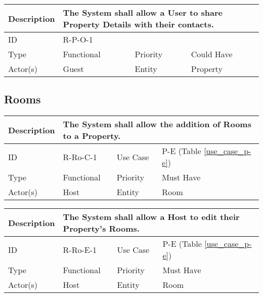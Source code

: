 \begin{tabular}{|p{1.5cm}|p{1.5cm}|p{1.5cm}|p{1.5cm}|p{1.5cm}|p{1.5cm}|p{1.5cm}|p{1.5cm}|p{1.5cm}|p{1.5cm}|p{1.5cm}|p{1.5cm}|}
    \hline
    \multicolumn{2}{|o|}{Description} & \multicolumn{10}{p{12.5cm}|}{The System shall allow a User to share Property Details with their contacts.} \\ \hline
    \multicolumn{2}{|o|}{ID}          & \multicolumn{10}{p{12.5cm}|}{R-P-O-1} \\ \hline
    \multicolumn{2}{|o|}{Type}        & \multicolumn{4}{n}{Functional}         & \multicolumn{2}{|o|}{Priority}    & \multicolumn{4}{n|}{Could Have}  \\ \hline
    \multicolumn{2}{|o|}{Actor(s)}    & \multicolumn{4}{n}{Guest}              & \multicolumn{2}{|o|}{Entity}      & \multicolumn{4}{n|}{Property} \\ \hline
\end{tabular}

\subsection{Rooms}

\begin{tabular}{|p{1.5cm}|p{1.5cm}|p{1.5cm}|p{1.5cm}|p{1.5cm}|p{1.5cm}|p{1.5cm}|p{1.5cm}|p{1.5cm}|p{1.5cm}|p{1.5cm}|p{1.5cm}|}
    \hline
    \multicolumn{2}{|o|}{Description} & \multicolumn{10}{p{12.5cm}|}{The System shall allow the addition of Rooms to a Property.} \\ \hline
    \multicolumn{2}{|o|}{ID}          & \multicolumn{4}{n}{R-Ro-C-1}            & \multicolumn{2}{|o|}{Use Case}    & \multicolumn{4}{n|}{P-E (Table \ref{use_case_p-e})} \\ \hline
    \multicolumn{2}{|o|}{Type}        & \multicolumn{4}{n}{Functional}         & \multicolumn{2}{|o|}{Priority}    & \multicolumn{4}{n|}{Must Have}  \\ \hline
    \multicolumn{2}{|o|}{Actor(s)}    & \multicolumn{4}{n}{Host}               & \multicolumn{2}{|o|}{Entity}      & \multicolumn{4}{n|}{Room} \\ \hline
\end{tabular}

\begin{tabular}{|p{1.5cm}|p{1.5cm}|p{1.5cm}|p{1.5cm}|p{1.5cm}|p{1.5cm}|p{1.5cm}|p{1.5cm}|p{1.5cm}|p{1.5cm}|p{1.5cm}|p{1.5cm}|}
    \hline
    \multicolumn{2}{|o|}{Description} & \multicolumn{10}{p{12.5cm}|}{The System shall allow a Host to edit their Property's Rooms.} \\ \hline
    \multicolumn{2}{|o|}{ID}          & \multicolumn{4}{n}{R-Ro-E-1}            & \multicolumn{2}{|o|}{Use Case}    & \multicolumn{4}{n|}{P-E (Table \ref{use_case_p-e})} \\ \hline
    \multicolumn{2}{|o|}{Type}        & \multicolumn{4}{n}{Functional}         & \multicolumn{2}{|o|}{Priority}    & \multicolumn{4}{n|}{Must Have}  \\ \hline
    \multicolumn{2}{|o|}{Actor(s)}    & \multicolumn{4}{n}{Host}               & \multicolumn{2}{|o|}{Entity}      & \multicolumn{4}{n|}{Room} \\ \hline
\end{tabular}

